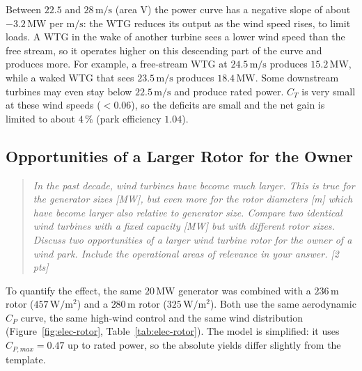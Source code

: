 Between $22.5$ and $28\,\mathrm{m/s}$ (area V) the power curve has a negative slope of about $-3.2\,\mathrm{MW}$ per $\mathrm{m/s}$: the WTG reduces its output as the wind speed rises, to limit loads. A WTG in the wake of another turbine sees a lower wind speed than the free stream, so it operates higher on this descending part of the curve and produces more. For example, a free-stream WTG at $24.5\,\mathrm{m/s}$ produces $15.2\,\mathrm{MW}$, while a waked WTG that sees $23.5\,\mathrm{m/s}$ produces $18.4\,\mathrm{MW}$. Some downstream turbines may even stay below $22.5\,\mathrm{m/s}$ and produce rated power. $C_T$ is very small at these wind speeds ($<0.06$), so the deficits are small and the net gain is limited to about $4\,\%$ (park efficiency $1.04$).

\subsection{Opportunities of a Larger Rotor for the Owner}
\label{sec:elec-rotor-owner}
\begin{quote}
\emph{In the past decade, wind turbines have become much larger. This is true for the generator sizes [MW], but even more for the rotor diameters [m] which have become larger also relative to generator size. Compare two identical wind turbines with a fixed capacity [MW] but with different rotor sizes. Discuss two opportunities of a larger wind turbine rotor for the owner of a wind park. Include the operational areas of relevance in your answer. [2 pts]}
\end{quote}

To quantify the effect, the same $20\,\mathrm{MW}$ generator was combined with a $236\,\mathrm{m}$ rotor ($457\,\mathrm{W/m^2}$) and a $280\,\mathrm{m}$ rotor ($325\,\mathrm{W/m^2}$). Both use the same aerodynamic $C_P$ curve, the same high-wind control and the same wind distribution (Figure~\ref{fig:elec-rotor}, Table~\ref{tab:elec-rotor}). The model is simplified: it uses $C_{P,max}=0.47$ up to rated power, so the absolute yields differ slightly from the template.

